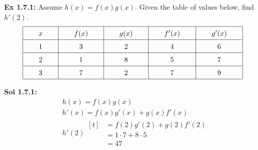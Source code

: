 \begin{tcolorbox}[example]
    \textbf{Ex 1.7.1: } Assume $h(x) = f(x)g(x)$. Given the table of values below, find $h'(2)$. \begin{align*}
        \arraycolsep=22pt\def\arraystretch{1.5}
        \begin{array}{|c|c|c|c|c|}
            \hline
            x & f(x) & g(x) & f'(x) & g'(x) \\ \hline
            1 & 3 & 2 & 4 & 6 \\ \hline
            2 & 1 & 8 & 5 & 7 \\ \hline
            3 & 7 & 2 & 7 & 9 \\
            \hline
        \end{array}
    \end{align*}
\end{tcolorbox}
\begin{tcolorbox}[solution]
    \textbf{Sol 1.7.1: } \begin{align*}
        & h(x) = f(x)g(x) \\[11pt]
        & h'(x) = f(x)g'(x) + g(x)f'(x) \\[11pt]
        & h'(2) \begin{aligned}[t]
            & = f(2)g'(2) + g(2)f'(2) \\[11pt]
            & = 1 \cdot 7 + 8 \cdot 5 \\[11pt]
            & = \boxed{47}
        \end{aligned}
    \end{align*}
\end{tcolorbox} \vspace{11pt}

